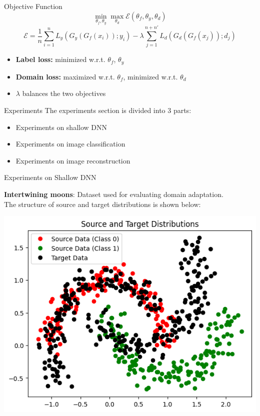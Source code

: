 \documentclass{beamer}
\begin{document}
\begin{frame}{Objective Function}
\[
\min_{\theta_f, \theta_y} \max_{\theta_d} \mathcal{E}(\theta_f, \theta_y, \theta_d)
\]
\vspace{-1em}
\[
\mathcal{E} = \frac{1}{n} \sum_{i=1}^{n} L_y(G_y(G_f(x_i)); y_i) 
- \lambda \sum_{j=1}^{n+n'} L_d(G_d(G_f(x_j)); d_j)
\]
\begin{itemize}
    \item \textbf{Label loss:} minimized w.r.t. $\theta_f$, $\theta_y$
    \item \textbf{Domain loss:} maximized w.r.t. $\theta_f$, minimized w.r.t. $\theta_d$
    \item $\lambda$ balances the two objectives
\end{itemize}
\end{frame}

\begin{frame}{Experiments}
The experiments section is divided into 3 parts: 
\begin{itemize}
    \item Experiments on shallow DNN
    \item Experiments on image classification
    \item Experiments on image reconstruction
\end{itemize}
    
\end{frame}


\begin{frame}{Experiments on Shallow DNN}
\vspace{-0.2cm}

\textbf{Intertwining moons}: Dataset used for evaluating domain adaptation.\\[0.2cm]
The structure of source and target distributions is shown below:

\vspace{0.5cm}

\begin{center}
    \includegraphics[width=0.7\linewidth]{moon.png}
\end{center}

\end{frame}
\end{document}
